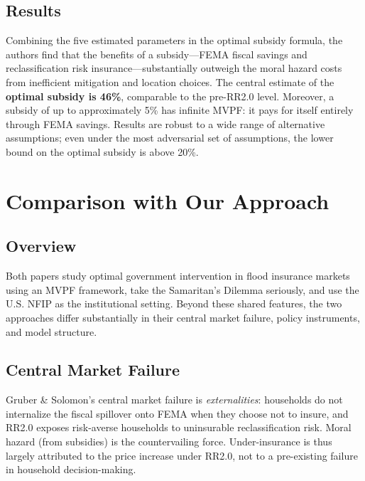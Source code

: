 \documentclass[12pt]{article}
\begin{document}
\subsection{Results}

Combining the five estimated parameters in the optimal subsidy formula, the authors find that the benefits of a subsidy---FEMA fiscal savings and reclassification risk insurance---substantially outweigh the moral hazard costs from inefficient mitigation and location choices. The central estimate of the \textbf{optimal subsidy is 46\%}, comparable to the pre-RR2.0 level. Moreover, a subsidy of up to approximately 5\% has infinite MVPF: it pays for itself entirely through FEMA savings. Results are robust to a wide range of alternative assumptions; even under the most adversarial set of assumptions, the lower bound on the optimal subsidy is above 20\%.

\section{Comparison with Our Approach}

\subsection{Overview}

Both papers study optimal government intervention in flood insurance markets using an MVPF framework, take the Samaritan's Dilemma seriously, and use the U.S. NFIP as the institutional setting. Beyond these shared features, the two approaches differ substantially in their central market failure, policy instruments, and model structure.

\subsection{Central Market Failure}

Gruber \& Solomon's central market failure is \emph{externalities}: households do not internalize the fiscal spillover onto FEMA when they choose not to insure, and RR2.0 exposes risk-averse households to uninsurable reclassification risk. Moral hazard (from subsidies) is the countervailing force. Under-insurance is thus largely attributed to the price increase under RR2.0, not to a pre-existing failure in household decision-making.
\end{document}
